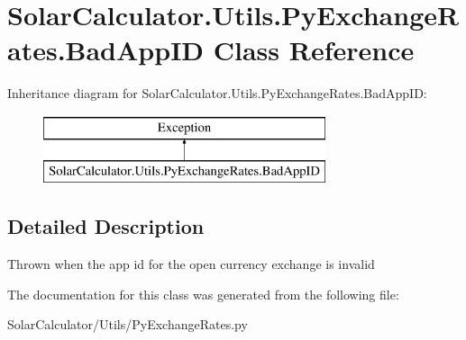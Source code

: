\hypertarget{class_solar_calculator_1_1_utils_1_1_py_exchange_rates_1_1_bad_app_i_d}{\section{Solar\-Calculator.\-Utils.\-Py\-Exchange\-Rates.\-Bad\-App\-I\-D Class Reference}
\label{class_solar_calculator_1_1_utils_1_1_py_exchange_rates_1_1_bad_app_i_d}
}
Inheritance diagram for Solar\-Calculator.\-Utils.\-Py\-Exchange\-Rates.\-Bad\-App\-I\-D\-:\begin{figure}[H]
\begin{center}
\leavevmode
\includegraphics[height=2.000000cm]{class_solar_calculator_1_1_utils_1_1_py_exchange_rates_1_1_bad_app_i_d}
\end{center}
\end{figure}


\subsection{Detailed Description}
\begin{DoxyVerb}Thrown when the app id for the open currency exchange is invalid\end{DoxyVerb}
 

The documentation for this class was generated from the following file\-:\begin{DoxyCompactItemize}
\item 
Solar\-Calculator/\-Utils/Py\-Exchange\-Rates.\-py\end{DoxyCompactItemize}
